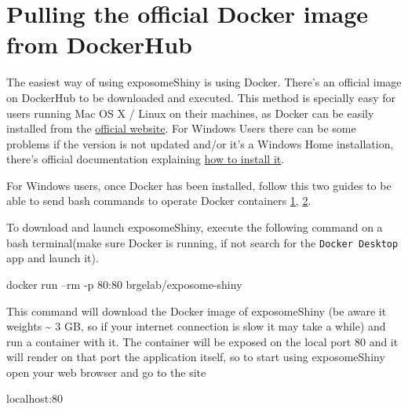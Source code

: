 \documentclass[
]{book}
\newenvironment{Shaded}{\begin{snugshade}}{\end{snugshade}}
\newcommand{\ExtensionTok}[1]{#1}
\newcommand{\NormalTok}[1]{#1}
\begin{document}
\hypertarget{pulling-the-official-docker-image-from-dockerhub}{%
\section{Pulling the official Docker image from DockerHub}\label{pulling-the-official-docker-image-from-dockerhub}}

The easiest way of using exposomeShiny is using Docker. There's an official image on DockerHub to be downloaded and executed. This method is specially easy for users running Mac OS X / Linux on their machines, as Docker can be easily installed from the \href{https://www.docker.com/get-started}{official website}. For Windows Users there can be some problems if the version is not updated and/or it's a Windows Home installation, there's official documentation explaining \href{https://docs.docker.com/docker-for-windows/install-windows-home/}{how to install it}.

For Windows users, once Docker has been installed, follow this two guides to be able to send bash commands to operate Docker containers \href{https://blog.nillsf.com/index.php/2020/02/17/setting-up-wsl2-windows-terminal-and-oh-my-zsh/}{1}, \href{https://docs.docker.com/docker-for-windows/wsl/}{2}.

To download and launch exposomeShiny, execute the following command on a bash terminal(make sure Docker is running, if not search for the \texttt{Docker\ Desktop} app and launch it).

\begin{Shaded}
\begin{Highlighting}[]
\ExtensionTok{docker}\NormalTok{ run --rm -p 80:80 brgelab/exposome-shiny}
\end{Highlighting}
\end{Shaded}

This command will download the Docker image of exposomeShiny (be aware it weights \textasciitilde{} 3 GB, so if your internet connection is slow it may take a while) and run a container with it. The container will be exposed on the local port 80 and it will render on that port the application itself, so to start using exposomeShiny open your web browser and go to the site

\begin{Shaded}
\begin{Highlighting}[]
\ExtensionTok{localhost}\NormalTok{:80}
\end{Highlighting}
\end{Shaded}
\end{document}
